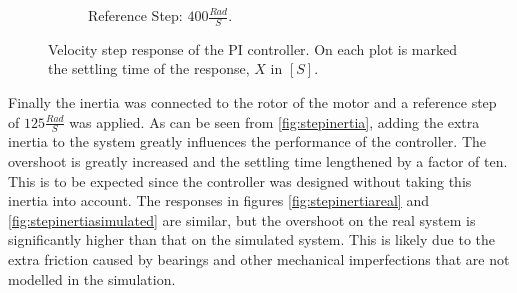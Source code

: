 \begin{figure}[!h]
\begin{subfigure}[t]{.49\linewidth}
		\caption{Reference Step: $400 \frac{Rad}{S}$.}
		\label{fig:step400}
	\end{subfigure}
	\caption[Velocity step response of PI controller.]{Velocity step response of the PI controller. On each plot is marked the settling time of the response, $X$ in $[S]$.}
	\label{fig:step}
\end{figure}

Finally the inertia was connected to the rotor of the motor and a reference step of $125\frac{Rad}{S}$ was applied.
As can be seen from \ref{fig:stepinertia}, adding the extra inertia to the system greatly influences the performance of the controller.
The overshoot is greatly increased and the settling time lengthened by a factor of ten.
This is to be expected since the controller was designed without taking this inertia into account.
The responses in figures \ref{fig:stepinertiareal} and \ref{fig:stepinertiasimulated} are similar, but the overshoot on the real system is significantly higher than that on the simulated system.
This is likely due to the extra friction caused by bearings and other mechanical imperfections that are not modelled in the simulation.

